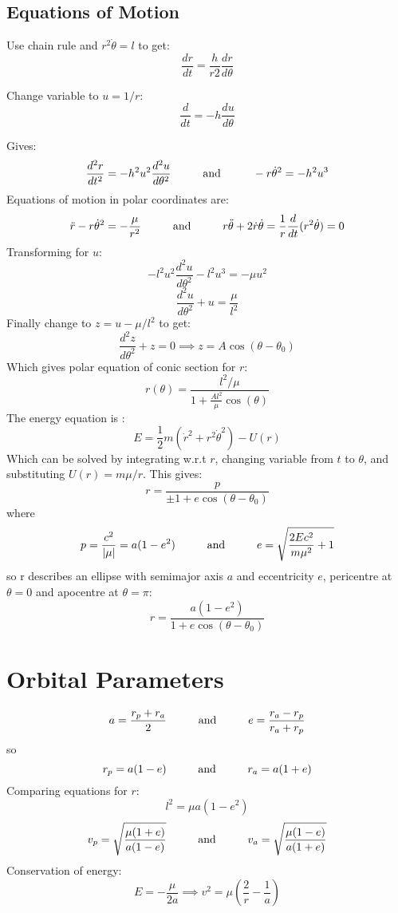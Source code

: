 \documentclass[table,cmyk]{article}
\begin{document}
\begin{longtable}
\subsection*{Equations of Motion}
Use chain rule and $r^2\dot{\theta} = l$ to get:
\[\frac{dr}{dt} = \frac{h}{r2}\frac{dr}{d\theta}\]

Change variable to $u = 1/r$:
\[\frac{d}{dt} = -h \frac{du}{d\theta}\]

Gives:
\[\frac{d^2r}{dt^2} = -h^2u^2\frac{d^2u}{d\theta^2}\text{\hspace{1cm}and\hspace{1cm}} -r\dot{\theta}^2 = -h^2u^3\]
Equations of motion in polar coordinates are:
\[\ddot{r} - r\dot{\theta}^2 = -\frac{\mu}{r^2}\text{\hspace{1cm}and\hspace{1cm}}r\ddot{\theta}+2\dot{r}\dot{\theta} = \frac{1}{r}\frac{d}{dt}(r^2\dot{\theta})=0\]
Transforming for $u$:
\[-l^2u^2\frac{d^2u}{d\theta^2}-l^2u^3 = -\mu u^2\]
\[\frac{d^2u}{d\theta^2}+u = \frac{\mu}{l^2}\]
Finally change to $z = u-\mu/l^2$ to get:
\[\frac{d^2z}{d\theta^2}+z = 0 \implies z = A\cos(\theta-\theta_0)\]
Which gives polar equation of conic section for $r$:
\[r(\theta) = \frac{l^2/\mu}{1+\frac{Al^2}{\mu}\cos(\theta)}\]
The energy equation is :
\[E = \frac{1}{2}m(\dot{r}^2+r^2\dot{\theta}^2)-U(r)\]
Which can be solved by integrating w.r.t $r$, changing variable from $t$ to $\theta$, and substituting $U(r) = m\mu/r$. This gives:
\[r = \frac{p}{\pm1+e\cos(\theta-\theta_0)}\]
where
\[p = \frac{c^2}{|\mu|}=a(1-e^2)\text{\hspace{1cm}and\hspace{1cm}}e = \sqrt{\frac{2Ec^2}{m\mu^2}+1}\]
so r describes an ellipse with semimajor axis $a$ and eccentricity $e$, pericentre at $\theta=0$ and apocentre at $\theta=\pi$:
\[r = \frac{a(1-e^2)}{1+e\cos(\theta-\theta_0)}\]



\vspace{2cm}


\tabularnewline\hline
\section*{Orbital Parameters}
\[a=\frac{r_p+r_a}{2}\text{\hspace{1cm}and\hspace{1cm}}e=\frac{r_a-r_p}{r_a+r_p}\]
so
\[r_p=a(1-e)\text{\hspace{1cm}and\hspace{1cm}}r_a=a(1+e)\]
Comparing equations for $r$:
\[l^2 = \mu a(1-e^2)\]
\[v_p = \sqrt{\frac{\mu(1+e)}{a(1-e)}}\text{\hspace{1cm}and\hspace{1cm}}v_a = \sqrt{\frac{\mu(1-e)}{a(1+e)}}\]
Conservation of energy:
\[E = -\frac{\mu}{2a} \implies v^2 = \mu\left(\frac{2}{r}-\frac{1}{a}\right)\]

\end{longtable}
\end{document}

